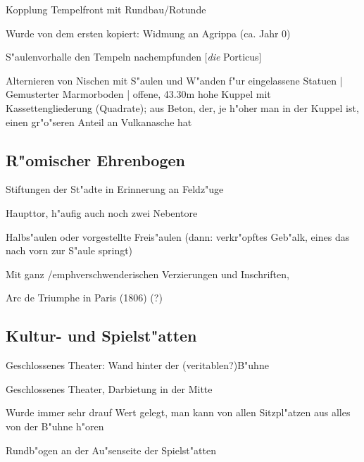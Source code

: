 \documentclass[emulatestandardclasses]{scrartcl}
\begin{document}
\begin{description}[leftmargin=!,labelwidth=\widthof{\bfseries Hintergrund}]
  \item[Hintergrund] Kopplung Tempelfront mit Rundbau/Rotunde 
  \item[Inschrift] Wurde von dem ersten kopiert: Widmung an Agrippa (ca. Jahr 0)
  \item[Porticus]  S"aulenvorhalle den Tempeln nachempfunden [\emph{die} Porticus]
  \item[Rotunde] Alternieren von Nischen mit S"aulen und W"anden f"ur eingelassene Statuen | Gemusterter Marmorboden | offene, 43.30m hohe Kuppel mit Kassettengliederung (Quadrate); aus Beton, der, je h"oher man in der Kuppel ist, einen gr"o"seren Anteil an Vulkanasche hat 
\end{description}

\subsection{R"omischer Ehrenbogen}

\begin{description}[leftmargin=!,labelwidth=\widthof{\bfseries Nachempfindung}]
  \item[Hintergrund] Stiftungen der St"adte in Erinnerung an Feldz"uge 
  \item[Tore] Haupttor, h"aufig auch noch zwei Nebentore
  \item[Gliederung] Halbs"aulen oder vorgestellte Freis"aulen (dann: verkr"opftes Geb"alk, eines das nach vorn zur S"aule springt)
  \item[Attica] Mit ganz /emph{verschwenderischen} Verzierungen und Inschriften,
  \item[Nachempfindung] Arc de Triumphe in Paris (1806) (?)
\end{description}

\subsection{Kultur- und Spielst"atten}

\begin{description}[leftmargin=!,labelwidth=\widthof{\bfseries Tabulariumsmotiv}]
  \item[Theater] Geschlossenes Theater: Wand hinter der (veritablen?)B"uhne
  \item[Amphitheater] Geschlossenes Theater, Darbietung in der Mitte 
  \item[Akustik] Wurde immer sehr drauf Wert gelegt, man kann von allen Sitzpl"atzen aus alles von der B"uhne h"oren
  \item[Tabulariumsmotiv] Rundb"ogen an der Au"senseite der Spielst"atten
\end{description}
\end{document}
